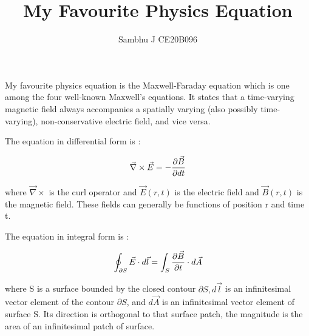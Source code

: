 \documentclass[a4paper, 12pt]{article}
\title{My Favourite Physics Equation}
\author{Sambhu J CE20B096}
\begin{document}
\maketitle
My favourite physics equation is the Maxwell-Faraday equation which is one among the four well-known Maxwell's equations. It states that a time-varying magnetic field always accompanies a spatially varying (also possibly time-varying), non-conservative electric field, and vice versa.

The equation in differential form is :

$$ \vec{\nabla} \times \vec{E} = -{\partial \vec{B} \over \partial dt} $$

where $ \vec{\nabla} \times $ is the curl operator and $ \vec{E}(r, t) $ is the electric field and $ \vec{B}(r, t) $ is the magnetic field. These fields can generally be functions of position r and time t. 

The equation in integral form is :

$$ \oint_{\partial S} {\vec{E} \cdot d \vec{l}} = \int_{S} {{\partial \vec{B} \over \partial t} \cdot d \vec{A}} $$

where S is a surface bounded by the closed contour $ \partial S , d \vec{l} $ is an infinitesimal vector element of the contour $ \partial S $, and $ d \vec{A} $ is an infinitesimal vector element of surface S. Its direction is orthogonal to that surface patch, the magnitude is the area of an infinitesimal patch of surface.
\end{document}
